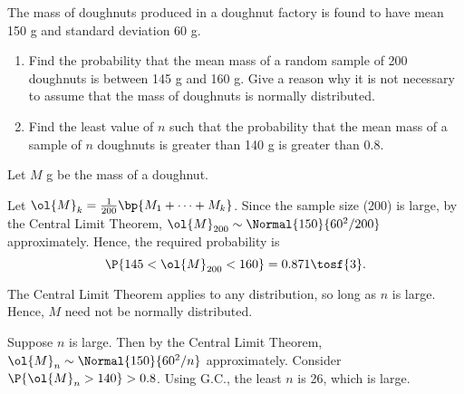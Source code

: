 \begin{problem}
    The mass of doughnuts produced in a doughnut factory is found to have mean 150 g and standard deviation 60 g.

    \begin{enumerate}
        \item Find the probability that the mean mass of a random sample of 200 doughnuts is between 145 g and 160 g. Give a reason why it is not necessary to assume that the mass of doughnuts is normally distributed.
        \item Find the least value of $n$ such that the probability that the mean mass of a sample of $n$ doughnuts is greater than 140 g is greater than $0.8$.
    \end{enumerate}
\end{problem}
\begin{solution}
    Let $M$ g be the mass of a doughnut.

    \begin{ppart}
        Let $\ol{M}_{k} = \frac1{200} \bp{M_1 + \dots + M_{k}}$. Since the sample size (200) is large, by the Central Limit Theorem, $\ol{M}_{200} \sim \Normal{150}{60^2/200}$ approximately. Hence, the required probability is \[\P{145 < \ol{M}_{200} < 160} = 0.871 \tosf{3}.\]

        The Central Limit Theorem applies to any distribution, so long as $n$ is large. Hence, $M$ need not be normally distributed.
    \end{ppart}
    \begin{ppart}
        Suppose $n$ is large. Then by the Central Limit Theorem, $\ol{M}_n \sim \Normal{150}{60^2/n}$ approximately. Consider $\P{\ol{M}_n > 140} > 0.8$. Using G.C., the least $n$ is 26, which is large.
    \end{ppart}
\end{solution}

